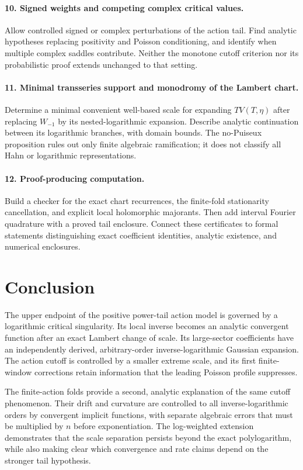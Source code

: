 \documentclass[11pt,a4paper]{article}
\numberwithin{equation}{section}
\theoremstyle{definition}
\theoremstyle{remark}
\begin{document}
\paragraph{10. Signed weights and competing complex critical values.}
Allow controlled signed or complex perturbations of the action tail.
Find analytic hypotheses replacing positivity and Poisson conditioning,
and identify when multiple complex saddles contribute. Neither the
monotone cutoff criterion nor its probabilistic proof extends
unchanged to that setting.

\paragraph{11. Minimal transseries support and monodromy of the Lambert chart.}
Determine a minimal convenient well-based scale for expanding
$T V(T,\eta)$ after replacing $W_{-1}$ by its nested-logarithmic
expansion. Describe analytic continuation between its logarithmic
branches, with domain bounds. The no-Puiseux proposition rules out only
finite algebraic ramification; it does not classify all Hahn or
logarithmic representations.

\paragraph{12. Proof-producing computation.}
Build a checker for the exact chart recurrences, the finite-fold
stationarity cancellation, and explicit local holomorphic majorants.
Then add interval Fourier quadrature with a proved tail enclosure.
Connect these certificates to formal statements distinguishing exact
coefficient identities, analytic existence, and numerical enclosures.

\section{Conclusion}
The upper endpoint of the positive power-tail action model is governed
by a logarithmic critical singularity. Its local inverse becomes an
analytic convergent function after an exact Lambert change of scale.
Its large-sector coefficients have an independently derived,
arbitrary-order inverse-logarithmic Gaussian expansion. The action
cutoff is controlled by a smaller extreme scale, and its first
finite-window corrections retain information that the leading
Poisson profile suppresses.

The finite-action folds provide a second, analytic explanation of the
same cutoff phenomenon. Their drift and curvature are controlled to
all inverse-logarithmic orders by convergent implicit functions, with
separate algebraic errors that must be multiplied by $n$ before
exponentiation. The log-weighted extension demonstrates that the scale
separation persists beyond the exact polylogarithm, while also making
clear which convergence and rate claims depend on the stronger tail
hypothesis.
\end{document}
